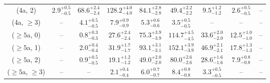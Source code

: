 \begin{table}[h!]
{\begin{tabular}{ccccccccc}
	(4a, 2) & $2.9^{+ 0.5 }_{- 0.5 }$ & $68.6^{+ 2.4 }_{- 2.4 }$ & $128.2^{+ 4.0 }_{- 4.0 }$ & $84.1^{+ 2.8 }_{- 2.8 }$ & $49.4^{+ 2.2 }_{- 2.2 }$ & $9.5^{+ 1.2 }_{- 1.2 }$ & $2.6^{+ 0.5 }_{- 0.5 }$ & -- \\[0.5ex] 
	(4a, $\ge3$) & -- & $4.1^{+ 0.5 }_{- 0.5 }$ & $7.9^{+ 0.9 }_{- 0.9 }$ & $5.3^{+ 0.6 }_{- 0.6 }$ & $3.5^{+ 0.5 }_{- 0.5 }$ & -- & -- & -- \\[0.5ex] 
	($\ge5$a, 0) & -- & $0.8^{+ 0.3 }_{- 0.3 }$ & $27.6^{+ 2.4 }_{- 2.4 }$ & $75.3^{+ 3.9 }_{- 3.9 }$ & $114.7^{+ 4.5 }_{- 4.5 }$ & $33.6^{+ 2.0 }_{- 2.0 }$ & $12.5^{+ 1.0 }_{- 1.0 }$ & -- \\[0.5ex] 
	($\ge5$a, 1) & -- & $2.0^{+ 0.4 }_{- 0.4 }$ & $31.9^{+ 1.7 }_{- 1.7 }$ & $93.1^{+ 3.1 }_{- 3.1 }$ & $152.1^{+ 3.9 }_{- 3.9 }$ & $46.9^{+ 2.1 }_{- 2.1 }$ & $17.8^{+ 1.3 }_{- 1.3 }$ & -- \\[0.5ex] 
	($\ge5$a, 2) & -- & $0.9^{+ 0.5 }_{- 0.5 }$ & $19.1^{+ 1.2 }_{- 1.2 }$ & $49.0^{+ 2.0 }_{- 2.0 }$ & $80.0^{+ 2.6 }_{- 2.6 }$ & $28.6^{+ 1.6 }_{- 1.6 }$ & $7.9^{+ 0.8 }_{- 0.8 }$ & -- \\[0.5ex] 
	($\ge5$a, $\ge3$) & -- & -- & $2.1^{+ 0.4 }_{- 0.4 }$ & $6.0^{+ 0.7 }_{- 0.7 }$ & $8.4^{+ 0.8 }_{- 0.8 }$ & $3.3^{+ 0.5 }_{- 0.5 }$ & -- & -- \\[0.5ex] 
	\hline
	\hline
\end{tabular}}
\end{table}
